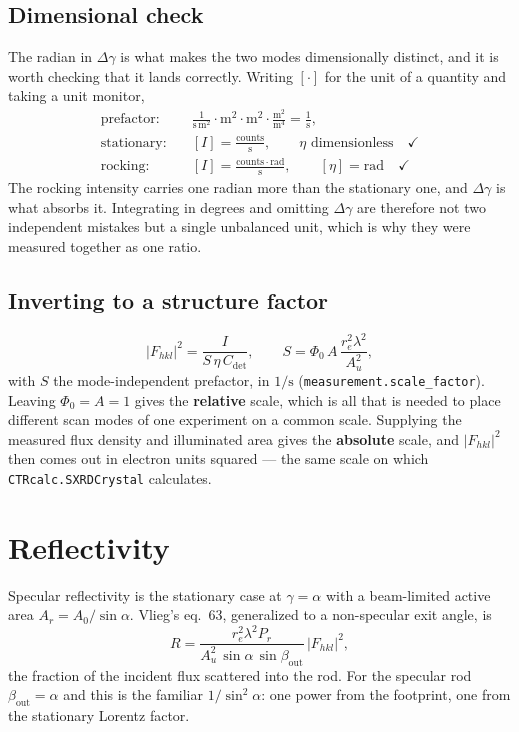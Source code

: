 \documentclass[11pt,a4paper]{article}
\newcommand{\Fhkl}{\left|F_{hkl}\right|^{2}}
\newcommand{\dgam}{\Delta\gamma}
\newcommand{\Cdet}{C_{\mathrm{det}}}
\newcommand{\bout}{\beta_{\mathrm{out}}}
\newcommand{\re}{r_{e}}
\newcommand{\Au}{A_{u}}
\newcommand{\code}[1]{\texttt{\small #1}}
\begin{document}
\subsection{Dimensional check}

The radian in $\dgam$ is what makes the two modes dimensionally distinct, and
it is worth checking that it lands correctly. Writing $[\cdot]$ for the unit
of a quantity and taking a unit monitor,
\begin{align}
  \text{prefactor:}&\quad
    \frac{1}{\mathrm{s}\,\mathrm{m}^{2}} \cdot \mathrm{m}^{2}
    \cdot \mathrm{m}^{2} \cdot \frac{\mathrm{m}^{2}}{\mathrm{m}^{4}}
    = \frac{1}{\mathrm{s}} , \\
  \text{stationary:}&\quad
    [I] = \frac{\text{counts}}{\mathrm{s}} ,
    \qquad \eta \text{ dimensionless} \quad\checkmark \\
  \text{rocking:}&\quad
    [I] = \frac{\text{counts}\cdot\mathrm{rad}}{\mathrm{s}} ,
    \qquad [\eta] = \mathrm{rad} \quad\checkmark
\end{align}
The rocking intensity carries one radian more than the stationary one, and
$\dgam$ is what absorbs it. Integrating in degrees and omitting $\dgam$ are
therefore not two independent mistakes but a single unbalanced unit, which is
why they were measured together as one ratio.

\subsection{Inverting to a structure factor}

\begin{equation}
  \Fhkl = \frac{I}{S\,\eta\,\Cdet} ,
  \qquad
  S = \Phi_0\, A\, \frac{\re^{2}\lambda^{2}}{\Au^{2}} ,
\end{equation}
with $S$ the mode-independent prefactor, in $1/\mathrm{s}$
(\code{measurement.scale\_factor}). Leaving $\Phi_0 = A = 1$ gives the
\textbf{relative} scale, which is all that is needed to place different scan
modes of one experiment on a common scale. Supplying the measured flux density
and illuminated area gives the \textbf{absolute} scale, and $\Fhkl$ then comes
out in electron units squared --- the same scale on which
\code{CTRcalc.SXRDCrystal} calculates.

\section{Reflectivity}

Specular reflectivity is the stationary case at $\gamma = \alpha$ with a
beam-limited active area $A_r = A_0/\sin\alpha$. Vlieg's eq.~63, generalized to
a non-specular exit angle, is
\begin{equation}
  R = \frac{\re^{2}\lambda^{2} P_r}{\Au^{2}\,\sin\alpha\,\sin\bout}\, \Fhkl ,
  \label{eq:refl}
\end{equation}
the fraction of the incident flux scattered into the rod. For the specular rod
$\bout = \alpha$ and this is the familiar $1/\sin^{2}\alpha$: one power from
the footprint, one from the stationary Lorentz factor.
\end{document}
